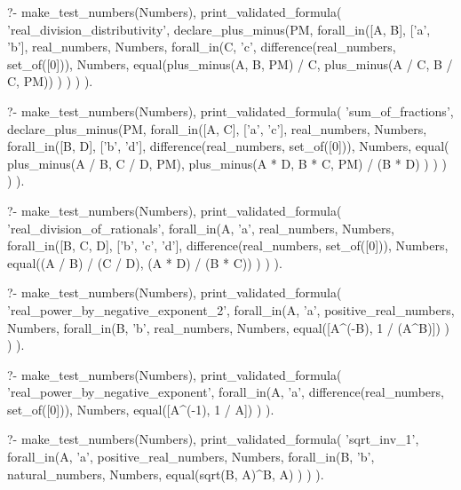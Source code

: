 \begin{fact}
\begin{prolog}
?-	make_test_numbers(Numbers),
	print_validated_formula(
		'real_division_distributivity',
		declare_plus_minus(PM,
			forall_in([A, B], ['a', 'b'], real_numbers, Numbers,
				forall_in(C, 'c', difference(real_numbers, set_of([0])), Numbers,
					equal(plus_minus(A, B, PM) / C, plus_minus(A / C, B / C, PM))
				)
			)
		)
	).
\end{prolog}
\begin{prolog}
?-	make_test_numbers(Numbers),
	print_validated_formula(
		'sum_of_fractions',
		declare_plus_minus(PM,
			forall_in([A, C], ['a', 'c'], real_numbers, Numbers,
				forall_in([B, D], ['b', 'd'], difference(real_numbers, set_of([0])), Numbers,
					equal(
						plus_minus(A / B, C / D, PM),
						plus_minus(A * D, B * C, PM) / (B * D)
					)
				)
			)
		)
	).
\end{prolog}
\begin{prolog}
?-	make_test_numbers(Numbers),
	print_validated_formula(
		'real_division_of_rationals',
		forall_in(A, 'a', real_numbers, Numbers,
			forall_in([B, C, D], ['b', 'c', 'd'], difference(real_numbers, set_of([0])), Numbers,
				equal((A / B) / (C / D), (A * D) / (B * C))
			)
		)
	).
\end{prolog}
\begin{prolog}
?-	make_test_numbers(Numbers),
	print_validated_formula(
		'real_power_by_negative_exponent_2',
		forall_in(A, 'a', positive_real_numbers, Numbers,
			forall_in(B, 'b', real_numbers, Numbers,
				equal([A^(-B), 1 / (A^B)])
			)
		)
	).
\end{prolog}
\begin{prolog}
?-	make_test_numbers(Numbers),
	print_validated_formula(
		'real_power_by_negative_exponent',
		forall_in(A, 'a', difference(real_numbers, set_of([0])), Numbers,
			equal([A^(-1), 1 / A])
		)
	).
\end{prolog}
\begin{prolog}
?-	make_test_numbers(Numbers),
	print_validated_formula(
		'sqrt_inv_1',
		forall_in(A, 'a', positive_real_numbers, Numbers,
			forall_in(B, 'b', natural_numbers, Numbers,
				equal(sqrt(B, A)^B, A)
			)
		)
	).				
\end{prolog}

\end{fact}
